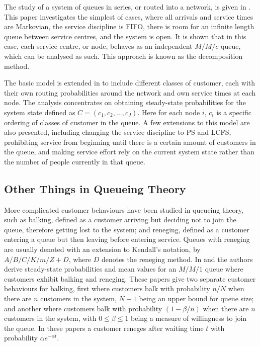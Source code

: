\documentclass{article}
\begin{document}
The study of a system of queues in series, or routed into a network, is given in \cite{jackson57}.
This paper investigates the simplest of cases, where all arrivals and service times are Markovian, the service discipline is FIFO, there is room for an infinite length queue between service centres, and the system is open.
It is shown that in this case, each service centre, or node, behaves as an
independent $M/M/c$ queue, which can be analysed as such.
This approach is known as the decomposition method.

The basic model is extended in \cite{kelly75} to include different classes of customer, each with their own routing probabilities around the network and own service times at each node.
The analysis concentrates on obtaining steady-state probabilities for the system state defined as $C = (c_1, c_2, ... , c_J)$.
Here for each node $i$, $c_i$ is a specific ordering of classes of customer in the queue.
A few extensions to this model are also presented, including changing the service discipline to PS and LCFS, prohibiting service from beginning until there is a certain amount of customers in the queue, and making service effort rely on the current system state rather than the number of people currently in that queue.


\subsection{Other Things in Queueing Theory} %

More complicated customer behaviours have been studied in queueing theory, such
as balking, defined as a customer arriving but deciding not to join the queue,
therefore getting lost to the system; and reneging, defined as a customer
entering a queue but then leaving before entering service. %
Queues with reneging are usually denoted with an extension to Kendall's notation, by $A/B/C/K/m/Z + D$, where $D$ denotes the reneging method.
In \cite{anckerjrgafarian63a} and \cite{anckerjrgafarian63b} the authors derive steady-state probabilities and mean values for an $M/M/1$ queue where customers exhibit balking and reneging.
These papers give two separate customer behaviours for balking, first where customers balk with probability $n/N$ when there are $n$ customers in the system, $N-1$ being an upper bound for queue size; and another where customers balk with probability $(1-\beta/n)$ when there are $n$ customers in the system, with $0\leq\beta\leq1$ being a measure of willingness to join the queue.
In these papers a customer reneges after waiting time $t$ with probability $\alpha e^{-\alpha t}$.
\end{document}
